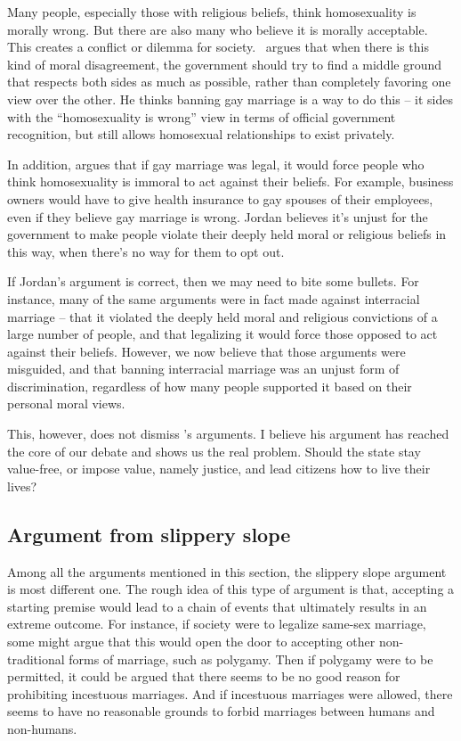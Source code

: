 \documentclass{article}
\begin{document}
Many people, especially those with religious beliefs, think homosexuality is morally wrong. But there are also many who believe it is morally acceptable. This creates a conflict or dilemma for society.~\textcite{jordanItWrongDiscriminate1995} argues that when there is this kind of moral disagreement, the government should try to find a middle ground that respects both sides as much as possible, rather than completely favoring one view over the other. He thinks banning gay marriage is a way to do this -- it sides with the ``homosexuality is wrong'' view in terms of official government recognition, but still allows homosexual relationships to exist privately. 

In addition,  argues that if gay marriage was legal, it would force people who think homosexuality is immoral to act against their beliefs. For example, business owners would have to give health insurance to gay spouses of their employees, even if they believe gay marriage is wrong. Jordan believes it's unjust for the government to make people violate their deeply held moral or religious beliefs in this way, when there's no way for them to opt out. 

If Jordan's argument is correct, then we may need to bite some bullets. For instance, many of the same arguments were in fact made against interracial marriage -- that it violated the deeply held moral and religious convictions of a large number of people, and that legalizing it would force those opposed to act against their beliefs. However, we now believe that those arguments were misguided, and that banning interracial marriage was an unjust form of discrimination, regardless of how many people supported it based on their personal moral views. 

This, however, does not dismiss 's arguments. I believe his argument has reached the core of our debate and shows us the real problem. Should the state stay value-free, or impose value, namely justice, and lead citizens how to live their lives? 


\subsection{Argument from slippery slope}

Among all the arguments mentioned in this section, the slippery slope argument is most different one. The rough idea of this type of argument is that, accepting a starting premise would lead to a chain of events that ultimately results in an extreme outcome. For instance, if society were to legalize same-sex marriage, some might argue that this would open the door to accepting other non-traditional forms of marriage, such as polygamy. Then if polygamy were to be permitted, it could be argued that there seems to be no good reason for prohibiting incestuous marriages. And if incestuous marriages were allowed, there seems to have no reasonable grounds to forbid marriages between humans and non-humans. 
\end{document}
